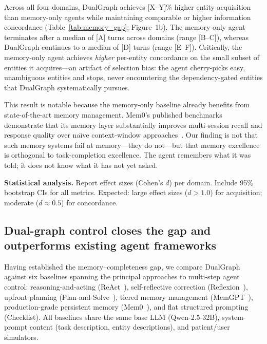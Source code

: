 \documentclass[11pt,a4paper]{article}
\newcommand{\placeholder}[1]{%
  \begin{tcolorbox}[colback=yellow!10,colframe=orange!60!black,
    fonttitle=\bfseries,title=Placeholder]
    #1
  \end{tcolorbox}%
}
\begin{document}
\begin{table}[!htbp]
\centering
\caption{Memory-only vs.\ DualGraph across four information-gathering domains.
Same base LLM (Qwen-2.5-32B) and memory module; only the presence of the
dual-graph controller differs. Mean $\pm$ s.d.\ over [N] cases per domain.
$p$-values from Welch's $t$-test with Bonferroni correction.}
\label{tab:memory_gap}
\small

\end{table}

Across all four domains, DualGraph achieves [X--Y]\% higher entity acquisition
than memory-only agents while maintaining comparable or higher information
concordance (Table~\ref{tab:memory_gap}; Figure~1b). The memory-only agent
terminates after a median of [A] turns across domains (range [B--C]), whereas
DualGraph continues to a median of [D] turns (range [E--F]). Critically, the
memory-only agent achieves \emph{higher} per-entity concordance on the small
subset of entities it acquires---an artifact of selection bias: the agent
cherry-picks easy, unambiguous entities and stops, never encountering the
dependency-gated entities that DualGraph systematically pursues.

This result is notable because the memory-only baseline already benefits from
state-of-the-art memory management. Mem0's published benchmarks demonstrate
that its memory layer substantially improves multi-session recall and
response quality over na\"{\i}ve context-window approaches~\cite{mem0_2025}.
Our finding is not that such memory systems fail at memory---they do
not---but that memory excellence is orthogonal to task-completion excellence.
The agent remembers what it was told; it does not know what it has not yet
asked.

\placeholder{%
  \textbf{Statistical analysis.} Report effect sizes (Cohen's $d$) per
  domain. Include 95\% bootstrap CIs for all metrics. Expected: large
  effect sizes ($d > 1.0$) for acquisition; moderate ($d \approx 0.5$)
  for concordance.
}


\subsection{Dual-graph control closes the gap and outperforms existing agent
frameworks}
\label{sec:results_baselines}

Having established the memory--completeness gap, we compare DualGraph against
six baselines spanning the principal approaches to multi-step agent control:
reasoning-and-acting (ReAct~\cite{yao2023react}), self-reflective correction
(Reflexion~\cite{shinn2023reflexion}), upfront planning
(Plan-and-Solve~\cite{wang2023plan}), tiered memory management
(MemGPT~\cite{packer2023memgpt}), production-grade persistent memory
(Mem0~\cite{mem0_2025}), and flat structured prompting (Checklist). All
baselines share the same base LLM (Qwen-2.5-32B), system-prompt content
(task description, entity descriptions), and patient/user simulators.
\end{document}
